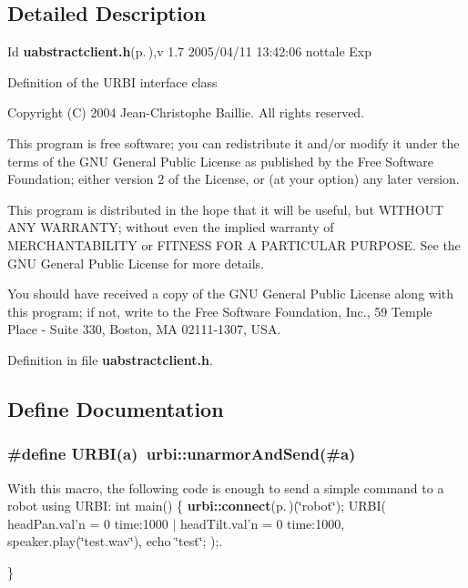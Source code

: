 \subsection{Detailed Description}
\begin{Desc}
\item[Id]{\bf uabstractclient.h}{\rm (p.\,\pageref{uabstractclient_8h})},v 1.7 2005/04/11 13:42:06 nottale Exp \end{Desc}


Definition of the URBI interface class

Copyright (C) 2004 Jean-Christophe Baillie. All rights reserved.

This program is free software; you can redistribute it and/or modify it under the terms of the GNU General Public License as published by the Free Software Foundation; either version 2 of the License, or (at your option) any later version.

This program is distributed in the hope that it will be useful, but WITHOUT ANY WARRANTY; without even the implied warranty of MERCHANTABILITY or FITNESS FOR A PARTICULAR PURPOSE. See the GNU General Public License for more details.

You should have received a copy of the GNU General Public License along with this program; if not, write to the Free Software Foundation, Inc., 59 Temple Place - Suite 330, Boston, MA 02111-1307, USA.

Definition in file {\bf uabstractclient.h}.

\subsection{Define Documentation}
\subsubsection{\setlength{\rightskip}{0pt plus 5cm}\#define URBI(a)\ urbi::unarmor\-And\-Send(\#a)}\label{uabstractclient_8h_a1}


With this macro, the following code is enough to send a simple command to a robot using URBI: int main() \{ {\bf urbi::connect}{\rm (p.\,\pageref{namespaceurbi_a7})}(\char`\"{}robot\char`\"{}); URBI( head\-Pan.val'n = 0 time:1000 $|$ head\-Tilt.val'n = 0 time:1000, speaker.play(\char`\"{}test.wav\char`\"{}), echo \char`\"{}test\char`\"{}; );. 

\}

